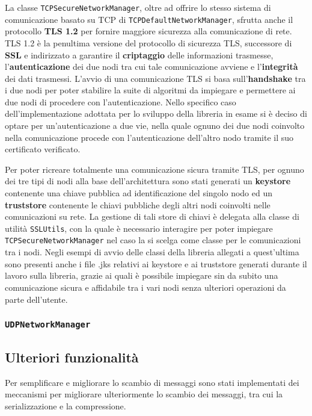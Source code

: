 La classe \texttt{TCPSecureNetworkManager}, oltre ad offrire lo stesso sistema di comunicazione basato su TCP di \texttt{TCPDefaultNetworkManager}, sfrutta anche il protocollo
\textbf{TLS 1.2} per fornire maggiore sicurezza alla comunicazione di rete. 
TLS 1.2 è la penultima versione del protocollo di sicurezza TLS, successore di \textbf{SSL} e indirizzato a garantire il \textbf{criptaggio} delle informazioni trasmesse,
l'\textbf{autenticazione} dei due nodi tra cui tale comunicazione avviene e l'\textbf{integrità} dei dati trasmessi.
L'avvio di una comunicazione TLS si basa sull'\textbf{handshake} tra i due nodi per poter stabilire la suite di algoritmi da impiegare e permettere ai due nodi di procedere con l'autenticazione.
Nello specifico caso dell'implementazione adottata per lo sviluppo della libreria in esame si è deciso di optare per un'autenticazione a due vie, nella quale ognuno dei due nodi coinvolto nella comunicazione
procede con l'autenticazione dell'altro nodo tramite il suo certificato verificato.

Per poter ricreare totalmente una comunicazione sicura tramite TLS, per ognuno dei tre tipi di nodi alla base dell'architettura sono stati generati un \textbf{keystore} contenente una chiave pubblica ad identificazione del singolo nodo ed un \textbf{truststore} contenente le chiavi pubbliche degli altri nodi coinvolti nelle comunicazioni su rete.
La gestione di tali store di chiavi è delegata alla classe di utilità \texttt{SSLUtils}, con la quale è necessario interagire per poter impiegare \texttt{TCPSecureNetworkManager} nel caso la si scelga come classe per le comunicazioni tra i nodi.
Negli esempi di avvio delle classi della libreria allegati a quest'ultima sono presenti anche i file .jks relativi ai keystore e ai truststore generati durante il lavoro sulla libreria, grazie ai quali è possibile impiegare sin da subito una comunicazione sicura e affidabile tra i vari nodi senza ulteriori operazioni da parte dell'utente.

\subsubsection{\texttt{UDPNetworkManager}}

\subsection{Ulteriori funzionalità}

Per semplificare e migliorare lo scambio di messaggi sono stati implementati dei meccanismi per migliorare ulteriormente lo scambio dei messaggi, tra cui la serializzazione e la compressione.


